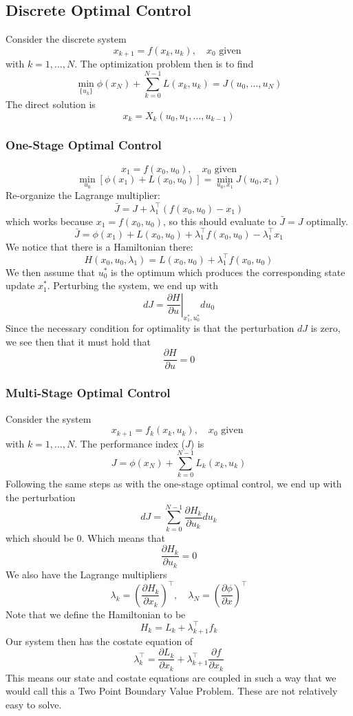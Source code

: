 \documentclass{article}
\begin{document}
\subsection{Discrete Optimal Control}

Consider the discrete system
\[x_{k+1} = f(x_k, u_k), \quad x_0\text{ given }\]
with $k = 1,\ldots,N$. The optimization problem then is to find
\[\min_{\{u_k\}} \phi(x_N) + \sum_{k=0}^{N-1}L(x_k,u_k) = J(u_0,\ldots,u_N)\]
The direct solution is
\[x_k = X_k(u_0, u_1, \ldots, u_{k-1})\]

\subsubsection{One-Stage Optimal Control}

\[x_1 = f(x_0,u_0),\quad x_0\text{ given}\]
\[\min_{u_0}\left[\phi(x_1) + L(x_0,u_0)\right] = \min_{u_0,x_1}J(u_0,x_1)\]
Re-organize the Lagrange multiplier:
\[\bar{J} = J + \lambda_1^\top(f(x_0,u_0)-x_1)\]
which works because $x_1 = f(x_0,u_0)$, so this should evaluate to $\bar{J} = J$ optimally.
\[\bar{J} = \phi(x_1) + L(x_0,u_0) + \lambda_1^\top f(x_0,u_0) - \lambda_1^\top x_1\]
We notice that there is a Hamiltonian there:
\[H(x_0,u_0,\lambda_1) = L(x_0,u_0) + \lambda_1^\top f(x_0,u_0)\]
We then assume that $u_0^*$ is the optimum which produces the corresponding state update $x_1^*$.
Perturbing the system, we end up with
\[dJ = \left.\frac{\partial H}{\partial u}\right|_{x_1^*,u_0^*}du_0\]
Since the necessary condition for optimality is that the perturbation $dJ$ is zero, we
see then that it must hold that
\[\frac{\partial H}{\partial u} = 0\]

\subsubsection{Multi-Stage Optimal Control}

Consider the system
\[x_{k+1} = f_k(x_k, u_k), \quad x_0\text{ given }\]
with $k = 1,\ldots,N$. The performance index ($J$) is
\[J = \phi(x_N) + \sum_{k=0}^{N-1}L_k(x_k,u_k)\]
Following the same steps as with the one-stage optimal control, we end up with the perturbation
\[dJ = \sum_{k=0}^{N-1}\frac{\partial H_k}{\partial u_k}du_k\]
which should be 0. Which means that
\[\frac{\partial H_k}{\partial u_k} = 0\]
We also have the Lagrange multipliers
\[\lambda_k = \left(\frac{\partial H_k}{\partial x_k}\right)^\top,\quad
\lambda_N = \left(\frac{\partial\phi}{\partial x}\right)^\top\]
Note that we define the Hamiltonian to be
\[H_k = L_k + \lambda_{k+1}^\top f_k\]
Our system then has the costate equation of
\[\lambda_k^\top = \frac{\partial L_k}{\partial x_k} + \lambda_{k+1}^\top\frac{\partial f}{\partial x_k}\]
This means our state and costate equations are coupled in such a way that we would call this a
Two Point Boundary Value Problem. These are not relatively easy to solve.
\end{document}
